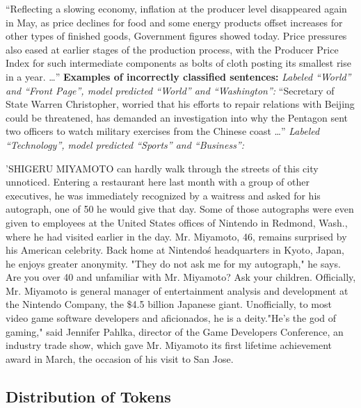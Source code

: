 \documentclass{article}
\begin{document}
“Reflecting a slowing economy, inflation at the producer level disappeared again in May, as price declines for food and some energy products offset increases for other types of finished goods, Government figures showed today. Price pressures also eased at earlier stages of the production process, with the Producer Price Index for such intermediate components as bolts of cloth posting its smallest rise in a year. …”
\newline
\newline
\textbf{Examples of incorrectly classified sentences:}
\newline
\newline
\textit{Labeled “World” and “Front Page”, model predicted “World” and “Washington”:}
\newline
\newline
“Secretary of State Warren Christopher, worried that his efforts to repair relations with Beijing could be threatened, has demanded an investigation into why the Pentagon sent two officers to watch military exercises from the Chinese coast …”
\newline
\newline
\textit{Labeled “Technology”, model predicted “Sports” and “Business”:}
\newline

'SHIGERU MIYAMOTO can hardly walk through the streets of this city unnoticed. Entering a restaurant here last month with a group of other executives, he was immediately recognized by a waitress and asked for his autograph, one of 50 he would give that day. Some of those autographs were even given to employees at the United States offices of Nintendo in Redmond, Wash., where he had visited earlier in the day. Mr. Miyamoto, 46, remains surprised by his American celebrity. Back home at Nintendo\'s headquarters in Kyoto, Japan, he enjoys greater anonymity. "They do not ask me for my autograph," he says. Are you over 40 and unfamiliar with Mr. Miyamoto? Ask your children. Officially, Mr. Miyamoto is general manager of entertainment analysis and development at the Nintendo Company, the \$4.5 billion Japanese giant. Unofficially, to most video game software developers and aficionados, he is a deity."He's the god of gaming," said Jennifer Pahlka, director of the Game Developers Conference, an industry trade show, which gave Mr. Miyamoto its first lifetime achievement award in March, the occasion of his visit to San Jose.

\subsection{Distribution of Tokens}
\end{document}
